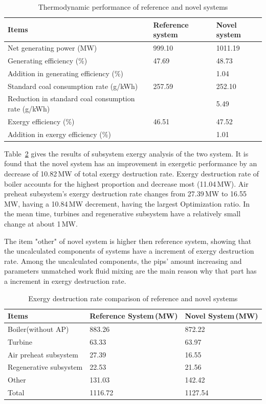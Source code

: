 \documentclass[preprint,12pt]{elsarticle}
\begin{document}
\begin{table}
\caption{Thermodynamic performance of reference and novel systems}
\label{table:thermal performance compare}
\centering
\begin{tabular}{p{7.5cm}p{1.75cm}p{1.75cm}}
\toprule 
Items & Reference system & Novel system\tabularnewline
\midrule
Net generating power (MW) & 999.10 & 1011.19\tabularnewline
Generating efficiency (\%) & 47.69 & 48.73\tabularnewline
Addition in generating efficiency (\%) &  & 1.04\tabularnewline
Standard coal consumption rate (g/kWh) & 257.59 & 252.10\tabularnewline
Reduction in standard coal consumption rate (g/kWh) &  & 5.49\tabularnewline
Exergy efficiency (\%) & 46.51 & 47.52\tabularnewline
Addition in exergy efficiency (\%) &  & 1.01\tabularnewline
\bottomrule
\end{tabular}
\end{table}
Table~\ref{table:system exergy campare} gives the results of subsystem exergy analysis of the two system. 
It is found that the novel system has an improvement in exergetic performance by an decrease of 10.82\,MW of total exergy destruction rate.
Exergy destruction rate of boiler accounts for the highest proportion and decrease most (11.04\,MW).
Air preheat subsystem's exergy destruction rate changes from 27.39\,MW to 16.55\,MW, having a 10.84\,MW decrement, having the largest Optimization ratio.
In the mean time, turbines and regenerative subsystem have a relatively small change at about 1\,MW. 

The item "other" of novel system is higher then reference system, showing that the uncalculated components of systems have a increment of exergy destruction rate.
Among the uncalculated components, the pips' amount increasing and  parameters unmatched work fluid mixing are the main reason why that part has a increment in exergy destruction rate.

\begin{table}
\caption{Exergy destruction rate comparison of reference and novel systems }
\label{table:system exergy campare}
\centering
\begin{tabular}{lll}
\toprule 
Items & Reference System\,(MW) & Novel System\,(MW)\tabularnewline
\midrule 
Boiler(without AP) & 883.26 & 872.22\tabularnewline
Turbine & 63.33 & 63.97\tabularnewline
Air preheat subsystem  & 27.39 & 16.55\tabularnewline
Regenerative subsystem & 22.53 & 21.56\tabularnewline
Other & 131.03 & 142.42 \tabularnewline
Total & 1116.72 & 1127.54\tabularnewline
\bottomrule
\end{tabular}
\end{table}
\end{document}

